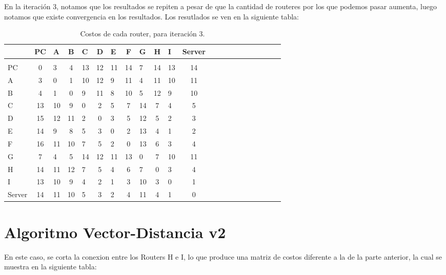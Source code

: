 \documentclass[a4papaer]{article}
\begin{document}
En la iteración 3, notamos que los resultados se repiten a pesar de que la cantidad de routeres por los que podemos pasar aumenta, luego notamos que existe convergencia en los resultados. Los resutlados se ven en la siguiente tabla:

\begin{table}[h]
\centering
\begin{tabular}{lclclclclclclclclclclc}

& PC & A & B & C & D & E & F & G & H & I & Server \\\hline\\
PC&0&3&4&13&12&11&14&7&14&13&14 \\
A&3&0&1&10&12&9&11&4&11&10&11 \\
B&4&1&0&9&11&8&10&5&12&9&10 \\
C&13&10&9&0&2&5&7&14&7&4&5 \\
D&15&12&11&2&0&3&5&12&5&2&3 \\
E&14&9&8&5&3&0&2&13&4&1&2 \\
F&16&11&10&7&5&2&0&13&6&3&4 \\
G&7&4&5&14&12&11&13&0&7&10&11 \\
H&14&11&12&7&5&4&6&7&0&3&4 \\
I&13&10&9&4&2&1&3&10&3&0&1 \\
Server&14&11&10&5&3&2&4&11&4&1&0 \\

\end{tabular}
\caption{\label{tab:widgets}Costos de cada router, para iteración 3.}
\end{table}
\pagebreak

\section{Algoritmo Vector-Distancia v2}
 
En este caso, se corta la conexion entre los Routers H e I, lo que produce una matriz de costos diferente a la de la parte anterior, la cual se muestra en la siguiente tabla:
\end{document}

